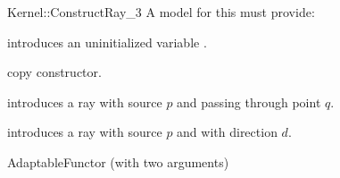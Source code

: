 \begin{ccRefFunctionObjectConcept}{Kernel::ConstructRay_3}
A model for this must provide:



\ccHidden {}
             {introduces an uninitialized variable .}

\ccHidden {}
            {copy constructor.}

            {introduces a ray  
             with source $p$ and passing through point $q$.}

            {introduces a ray  with source $p$ and with 
             direction $d$.}

\ccRefines
AdaptableFunctor (with two arguments)

\ccSeeAlso
{}\\

\end{ccRefFunctionObjectConcept}
